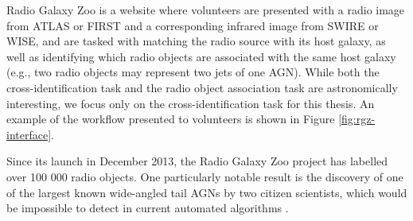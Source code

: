     Radio Galaxy Zoo is a website where volunteers are presented with a radio
    image from ATLAS or FIRST and a corresponding infrared image from SWIRE or
    WISE, and are tasked with matching the radio source with its host galaxy, as
    well as identifying which radio objects are associated with the same host
    galaxy (e.g., two radio objects may represent two jets of one AGN). While
    both the cross-identification task and the radio object association task are
    astronomically interesting, we focus only on the cross-identification task
    for this thesis. An example of the workflow presented to volunteers is shown
    in Figure \ref{fig:rgz-interface}.

    Since its launch in December 2013, the Radio Galaxy Zoo project has labelled over 100 000 radio objects. One particularly notable result is the discovery of one of the largest known wide-angled tail AGNs by two citizen scientists, which would be impossible to detect in current automated algorithms \citep{banfield16}.

